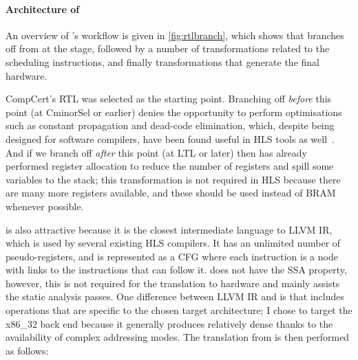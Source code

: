 \paragraph{Architecture of \vericert{}}

An overview of \vericert{}'s workflow is given in \cref{fig:rtlbranch}, which
shows that \vericert{} branches off from \compcert{} at the \rtl{} stage,
followed by a number of transformations related to the scheduling instructions,
and finally transformations that generate the final hardware.

CompCert's \gls{RTL} was selected as the starting point. Branching off
\emph{before} this point (at CminorSel or earlier) denies \compcert{} the
opportunity to perform optimisations such as constant propagation and dead-code
elimination, which, despite being designed for software compilers, have been
found useful in HLS tools as well~\cite{cong11_high_level_synth_fpgas}. And if
we branch off \emph{after} this point (at \gls{LTL} or later) then \compcert{}
has already performed register allocation to reduce the number of registers and
spill some variables to the stack; this transformation is not required in HLS
because there are many more registers available, and these should be used
instead of \gls{BRAM} whenever possible.

\rtl{} is also attractive because it is the closest intermediate language to
LLVM \gls{IR}, which is used by several existing HLS compilers.  It has an
unlimited number of pseudo-registers, and is represented as a \gls{CFG} where
each instruction is a node with links to the instructions that can follow it.
\rtl{} does not have the SSA property, however, this is not required for the
translation to hardware and mainly assists the static analysis passes.  One
difference between LLVM \gls{IR} and \rtl{} is that \rtl{} includes operations
that are specific to the chosen target architecture; I chose to target the
x86\_32 back end because it generally produces relatively dense \rtl{} thanks to
the availability of complex addressing modes.  The translation from \rtl{} is
then performed as follows:


